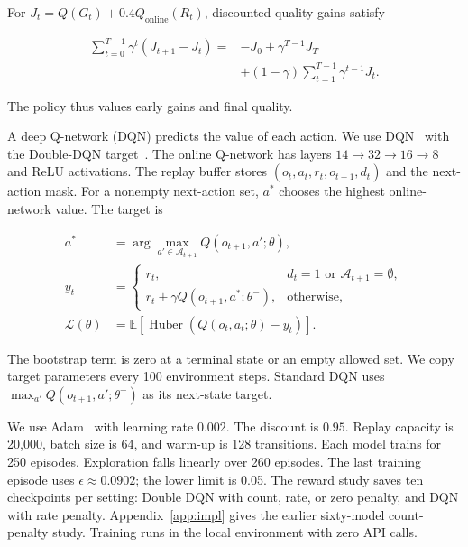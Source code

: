 For $J_t=Q(G_t)+0.4Q_{\mathrm{online}}(R_t)$, discounted quality gains satisfy

\begin{equation}
\begin{split}
\sum_{t=0}^{T-1}\gamma^t(J_{t+1}-J_t)
={}&-J_0+\gamma^{T-1}J_T\\
&+(1-\gamma)\sum_{t=1}^{T-1}\gamma^{t-1}J_t.
\end{split}
\end{equation}

The policy thus values early gains and final quality.

A deep Q-network (DQN) predicts the value of each action.
We use DQN~\cite{mnih2015human} with the Double-DQN target~\cite{vanhasselt2016deep}.
The online Q-network has layers $14\rightarrow32\rightarrow16\rightarrow8$
and ReLU activations. The replay buffer stores $(o_t,a_t,r_t,o_{t+1},d_t)$
and the next-action mask. For a nonempty next-action set, $a^*$ chooses
the highest online-network value. The target is

\begin{equation}
\begin{aligned}
a^*&=\arg\max_{a'\in\mathcal A_{t+1}}Q(o_{t+1},a';\theta),\\
y_t&=\begin{cases}
r_t,&d_t=1\text{ or }\mathcal A_{t+1}=\emptyset,\\
r_t+\gamma Q(o_{t+1},a^*;\theta^-),&\text{otherwise},
\end{cases}\\
\mathcal L(\theta)&=\mathbb E[\operatorname{Huber}(Q(o_t,a_t;\theta)-y_t)].
\end{aligned}
\end{equation}

The bootstrap term is zero at a terminal state or an empty allowed set.
We copy target parameters every 100 environment steps. Standard DQN uses
$\max_{a'}Q(o_{t+1},a';\theta^-)$ as its next-state target.

We use Adam~\cite{ref_adam2015} with learning rate $0.002$.
The discount is $0.95$. Replay capacity is
20,000, batch size is 64, and warm-up is 128 transitions. Each model trains
for 250 episodes. Exploration falls linearly over 260 episodes.
The last training episode uses $\epsilon\approx0.0902$; the lower limit
is 0.05. The reward study saves ten checkpoints per setting: Double DQN
with count, rate, or zero penalty, and DQN with rate penalty.
Appendix~\ref{app:impl} gives the earlier sixty-model count-penalty study.
Training runs in the local environment with zero API calls.

